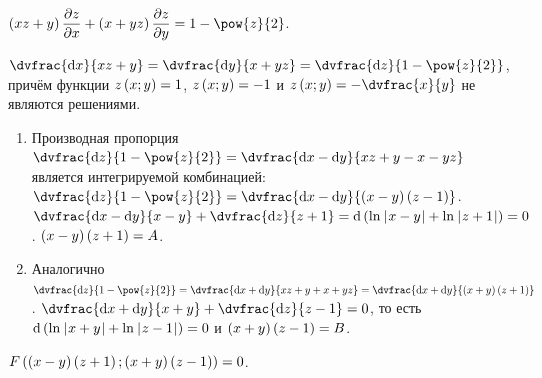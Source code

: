\documentclass[a5paper,10pt]{article}
\begin{document}
    $\br{xz + y} \parder{z} {x} + \br{x + yz} \parder{z} {y} = 1 - \pow{z}{2}$.
    
    $\dvfrac {\di x} {xz + y} = \dvfrac {\di y} {x + yz} = \dvfrac {\di z} {1 - \pow{z}{2}}$,
    причём функции $z\left(\hspace{0.01em}x; y\hspace{0.01em}\right) = 1$, $z\left(\hspace{0.01em}x; y\hspace{0.01em}\right) = -1$ и $z\br{x; y} = -\dvfrac{x}{y}$ не являются решениями.
    
    \begin{enumerate}
        \item Производная пропорция
        $\dvfrac {\di z} {1 - \pow{z}{2}} = \dvfrac {\di x - \di y} {xz + y - x - yz}$
        является интегрируемой комбинацией:
        $\dvfrac {\di z} {1 - \pow{z}{2}} = \dvfrac {\di x - \di y} {\br{x - y}\br{z - 1}}$.
        $\dvfrac {\di x - \di y} {x - y} + \dvfrac {\di z} {z + 1}
        = \di\br{\ln\vbr{x - y} + \ln\vbr{z + 1}} = 0$.
        $\left(\hspace{0.01em}x - y\hspace{0.01em}\right)\left(\hspace{0.01em}z + 1\hspace{0.01em}\right) = A$.
        
        \item Аналогично
        $\dvfrac {\di z} {1 - \pow{z}{2}} 
        = \dvfrac {\di x + \di y} {xz + y + x + yz}
        = \dvfrac {\di x + \di y} {\br{x + y}\br{z + 1}}$.
        $\dvfrac{\di x + \di y}{x + y} + \dvfrac{\di z}{z - 1} = 0$,
        то есть
        $\di\br{\ln\vbr{x + y} + \ln\vbr{z - 1}} = 0$ и
        $\left(\hspace{0.01em}x + y\hspace{0.01em}\right)\left(\hspace{0.01em}z - 1\hspace{0.01em}\right) = B$.
    \end{enumerate}
    
    $F\left(\hspace{0.01em}\left(\hspace{0.01em}x - y\hspace{0.01em}\right)\left(\hspace{0.01em}z + 1\hspace{0.01em}\right); \left(\hspace{0.01em}x + y\hspace{0.01em}\right)\left(\hspace{0.01em}z - 1\hspace{0.01em}\right)\hspace{0.01em}\right) = 0$.
\end{document}
